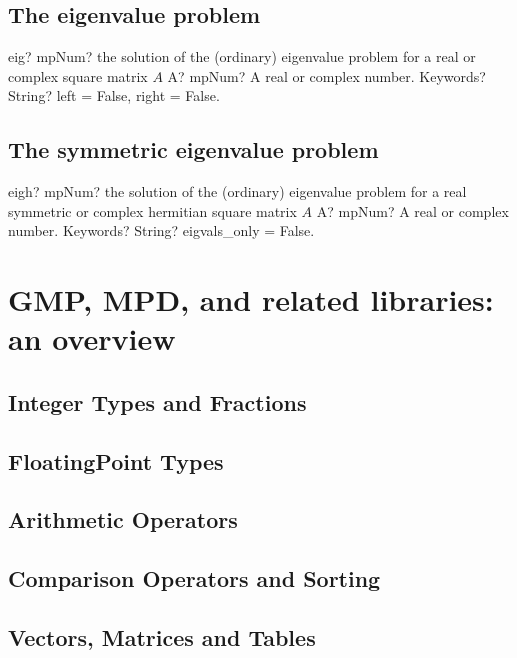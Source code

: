 \documentclass[12pt,a4paper,openany]{book}
\begin{document}
\section{The eigenvalue problem}

\begin{mpFunctionsExtract}
\mpFunctionTwo
{eig? mpNum? the solution of the (ordinary) eigenvalue problem for a real or complex square matrix $A$}
{A? mpNum? A real or complex number.}
{Keywords? String? left = False, right = False.}
\end{mpFunctionsExtract}

\section{The symmetric eigenvalue problem}

\begin{mpFunctionsExtract}
\mpFunctionTwo
{eigh? mpNum? the solution of the (ordinary) eigenvalue problem for a real symmetric or complex hermitian square matrix $A$}
{A? mpNum? A real or complex number.}
{Keywords? String? eigvals\_only = False.}
\end{mpFunctionsExtract}

\chapter{GMP, MPD, and related libraries: an overview}

\section{Integer Types and Fractions}

\section{FloatingPoint Types}

\section{Arithmetic Operators}

\section{Comparison Operators and Sorting}

\section{Vectors, Matrices and Tables}
\end{document}
